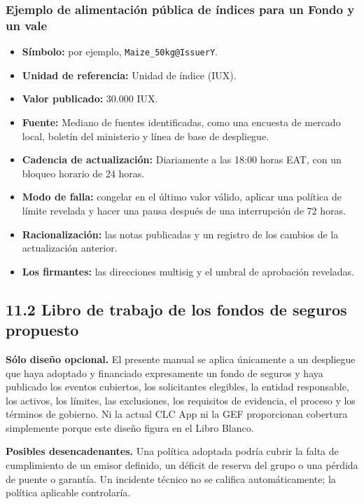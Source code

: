 \documentclass[11pt]{article}
\begin{document}
\subsubsection*{Ejemplo de alimentación pública de índices para un Fondo y un vale}

\begin{itemize}[leftmargin=*]
\item \textbf{Símbolo:} por ejemplo, \texttt{Maize\_50kg@IssuerY}.
\item \textbf{Unidad de referencia:} Unidad de índice (IUX).
\item \textbf{Valor publicado:} 30.000 IUX.
\item \textbf{Fuente:} Mediano de fuentes identificadas, como una encuesta de mercado local, boletín del ministerio y línea de base de despliegue.
\item \textbf{Cadencia de actualización:} Diariamente a las 18:00 horas EAT, con un bloqueo horario de 24 horas.
\item \textbf{Modo de falla:} congelar en el último valor válido, aplicar una política de límite revelada y hacer una pausa después de una interrupción de 72 horas.
\item \textbf{Racionalización:} las notas publicadas y un registro de los cambios de la actualización anterior.
\item \textbf{Los firmantes:} las direcciones multisig y el umbral de aprobación reveladas.
\end{itemize}
\subsection*{11.2 Libro de trabajo de los fondos de seguros propuesto}

\textbf{Sólo diseño opcional.} El presente manual se aplica únicamente a un despliegue que haya adoptado y financiado expresamente un fondo de seguros y haya publicado los eventos cubiertos, los solicitantes elegibles, la entidad responsable, los activos, los límites, las exclusiones, los requisitos de evidencia, el proceso y los términos de gobierno. Ni la actual CLC App ni la GEF proporcionan cobertura simplemente porque este diseño figura en el Libro Blanco.

\textbf{Posibles desencadenantes.} Una política adoptada podría cubrir la falta de cumplimiento de un emisor definido, un déficit de reserva del grupo o una pérdida de puente o garantía. Un incidente técnico no se califica automáticamente; la política aplicable controlaría.
\end{document}
